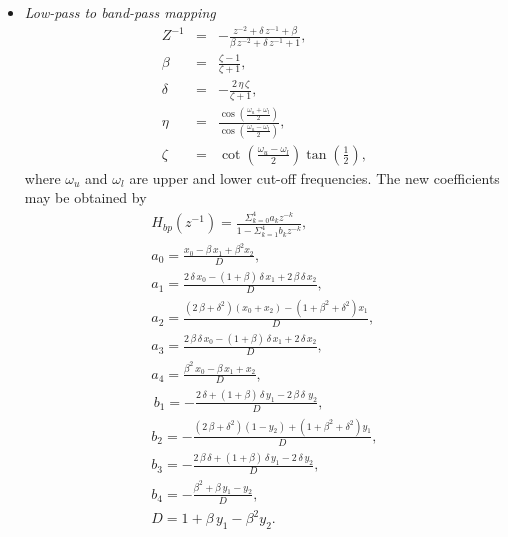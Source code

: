 \documentclass{sebase}
\begin{document}
\begin{itemize}
\item \textit{Low-pass to band-pass mapping} 
\begin{eqnarray}
Z^{-1} &=&-\frac{z^{-2}+\delta \,z^{-1}+\beta }{\beta \,z^{-2}+\delta
\,z^{-1}+1},  \label{Z_low2BandPass} \\
\beta &=&\frac{\zeta -1}{\zeta +1},  \label{Beta_low2BandPass} \\
\delta &=&-\frac{2\,\eta \,\zeta }{\zeta +1},  \label{Eta_low2BandPass} \\
\eta &=&\frac{\cos \left( \frac{\omega _{u}+\omega _{l}}{2}\right) }{\cos
\left( \frac{\omega _{u}-\omega _{l}}{2}\right) },  \label{Ksi_low2BandPass}
\\
\zeta &=&\cot \left( \frac{\omega _{u}-\omega _{l}}{2}\right) \tan \left( 
\frac{1}{2}\right) ,
\end{eqnarray}
where $\omega _{u}$ and $\omega _{l}$ are upper and lower cut-off
frequencies. The new coefficients may be obtained by 
\begin{gather}
H_{bp}\left( z^{-1}\right) =\frac{\Sigma _{k=0}^{4}a_{k}z^{-k}}{1-\Sigma
_{k=1}^{4}b_{k}z^{-k}}, \\
a_{0}=\frac{x_{0}-\beta \,x_{1}+\beta ^{2}x_{2}}{D},  \label{a0_Band_Pass} \\
a_{1}=\frac{2\,\delta \,x_{0}-\left( 1+\beta \right) \,\delta
\,x_{1}+2\,\beta \,\delta \,x_{2}}{D},  \label{a1_Band_Pass} \\
a_{2}=\frac{\left( 2\,\beta +\delta ^{2}\right) \left( x_{0}+x_{2}\right)
-\left( 1+\beta ^{2}+\delta ^{2}\right) x_{1}}{D},  \label{a2_Band_Pass} \\
a_{3}=\frac{2\,\beta \,\delta \,x_{0}-\left( 1+\beta \right) \,\delta
\,x_{1}+2\,\delta \,x_{2}}{D},  \label{a3_Band_Pass} \\
a_{4}=\frac{\beta ^{2}\,x_{0}-\beta \,x_{1}+x_{2}}{D},  \label{a4_Band_Pass}
\\
\,b_{1}=-\frac{2\,\delta +\left( 1+\beta \right) \,\delta \,y_{1}-2\,\beta
\,\delta \,\,y_{2}}{D},  \label{b1_Band_Pass} \\
b_{2}=-\frac{\left( 2\,\beta +\delta ^{2}\right) \left( 1-y_{2}\right)
+\left( 1+\beta ^{2}+\delta ^{2}\right) y_{1}}{D},  \label{b2_Band_Pass} \\
b_{3}=-\frac{2\,\beta \,\delta +\left( 1+\beta \right) \,\delta
\,y_{1}-2\,\delta \,y_{2}}{D},  \label{b3_Band_Pass} \\
b_{4}=-\frac{\beta ^{2}+\beta \,y_{1}-y_{2}}{D},  \label{b4_Band_Pass} \\
D=1+\beta \,y_{1}-\beta ^{2}y_{2}.  \label{D_Band_Pass}
\end{gather}


\end{itemize}
\end{document}
